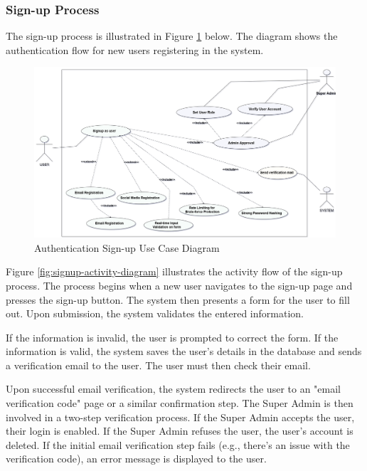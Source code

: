 \subsubsection{Sign-up Process}
The sign-up process is illustrated in Figure \ref{fig:signup-diagram} below. The diagram shows the authentication flow for new users registering in the system.

\begin{figure}[ht!]
    \centering
    \includegraphics[width=1.03\textwidth]{images/diagram_de_case_d_utilisation_signup.png}
    \caption{Authentication Sign-up Use Case Diagram}
    \label{fig:signup-diagram}
\end{figure}

Figure \ref{fig:signup-activity-diagram} illustrates the activity flow of the sign-up process. The process begins when a new user navigates to the sign-up page and presses the sign-up button. The system then presents a form for the user to fill out. Upon submission, the system validates the entered information. 

If the information is invalid, the user is prompted to correct the form. If the information is valid, the system saves the user's details in the database and sends a verification email to the user. The user must then check their email. 

Upon successful email verification, the system redirects the user to an "email verification code" page or a similar confirmation step. The Super Admin is then involved in a two-step verification process. If the Super Admin accepts the user, their login is enabled. If the Super Admin refuses the user, the user's account is deleted. If the initial email verification step fails (e.g., there's an issue with the verification code), an error message is displayed to the user.


